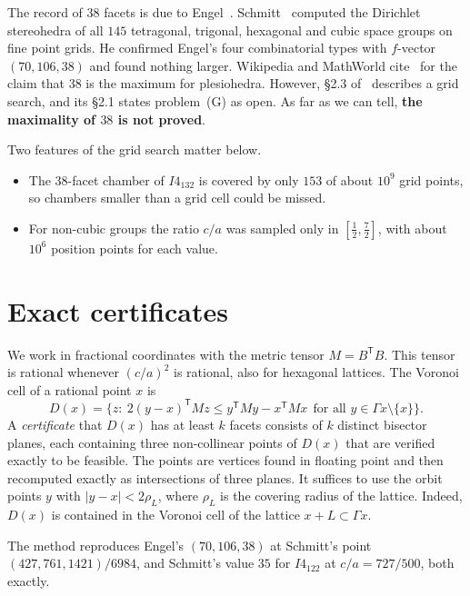 \documentclass[11pt]{amsart}
\theoremstyle{definition}
\begin{document}
The record of $38$ facets is due to Engel~\cite{Eng81}. Schmitt~\cite{Sch16} computed the Dirichlet stereohedra of all
$145$ tetragonal, trigonal, hexagonal and cubic space groups on fine point grids. He confirmed Engel's four
combinatorial types with $f$-vector $(70,106,38)$ and found nothing larger. Wikipedia and MathWorld cite~\cite{Sch16}
for the claim that $38$ is the maximum for plesiohedra. However, \S2.3 of~\cite{Sch16} describes a grid search, and its
\S2.1 states problem~(G) as open. As far as we can tell, \textbf{the maximality of $38$ is not proved}.

Two features of the grid search matter below.
\begin{itemize}[leftmargin=1.5em]
\item The $38$-facet chamber of $I4_132$ is covered by only $153$ of about $10^9$ grid points, so chambers smaller
than a grid cell could be missed.
\item For non-cubic groups the ratio $c/a$ was sampled only in $[\tfrac12,\tfrac72]$, with about $10^6$ position
points for each value.
\end{itemize}

\section{Exact certificates}
We work in fractional coordinates with the metric tensor $M=B^{\mathsf T}B$. This tensor is rational whenever $(c/a)^2$
is rational, also for hexagonal lattices. The Voronoi cell of a rational point $x$ is
\[
D(x)=\{z:\ 2(y-x)^{\mathsf T}Mz\le y^{\mathsf T}My-x^{\mathsf T}Mx\ \ \text{for all } y\in\Gamma x\setminus\{x\}\}.
\]
A \emph{certificate} that $D(x)$ has at least $k$ facets consists of $k$ distinct bisector planes, each containing three
non-collinear points of $D(x)$ that are verified exactly to be feasible. The points are vertices found in floating
point and then recomputed exactly as intersections of three planes. It suffices to use the orbit points $y$ with
$|y-x|<2\rho_L$, where $\rho_L$ is the covering radius of the lattice. Indeed, $D(x)$ is contained in the Voronoi cell of
the lattice $x+L\subset\Gamma x$.

The method reproduces Engel's $(70,106,38)$ at Schmitt's point $(427,761,1421)/6984$, and Schmitt's value $35$ for
$I4_122$ at $c/a=727/500$, both exactly.
\end{document}
